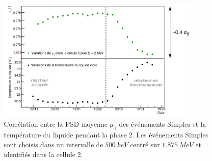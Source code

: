{\begin{figure}[h!]
\centering
\includegraphics[width=0.9\textwidth]{images/PSD_vs_temperature.png}
\caption[Corrélation entre la PSD et la température du liquide.]{Corrélation entre la PSD moyenne $\mu_\gamma$ des événements Simples et la température du liquide pendant la phase 2. Les événements Simples sont choisis dans un intervalle de $\SI{500}{keV}$ centré sur $\SI{1.875}{MeV}$ et identifiés dans la cellule 2.}
\label{fig:PSD_vs_temperature.png}
\end{figure}

%
%
%
%

}
